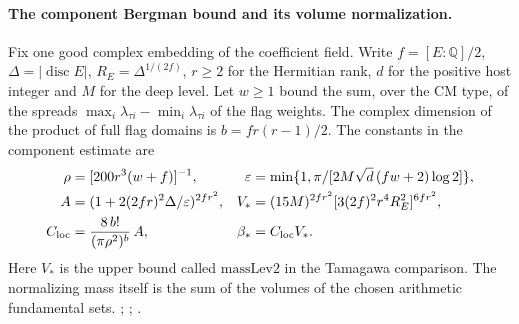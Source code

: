 \paragraph{The component Bergman bound and its volume normalization.}
Fix one good complex embedding of the coefficient field. Write
\(f=[E:\mathbb Q]/2\), \(\Delta=|\operatorname{disc}E|\),
\(R_E=\Delta^{1/(2f)}\), \(r\ge2\) for the Hermitian rank,
\(d\) for the positive host integer and \(M\) for the deep level.
Let \(w\ge1\) bound the sum, over the CM type, of the spreads
\(\max_i\lambda_{\tau i}-\min_i\lambda_{\tau i}\) of the flag weights.
The complex dimension of the product of full flag domains is
\(b=fr(r-1)/2\). The constants in the component estimate are
\begin{align*}
 \rho&=[200r^3(w+f)]^{-1},&
 \varepsilon&=\min\{1,\pi/[2M\sqrt d\,(fw+2)\log2]\},\\
 A&=(1+2(2fr)^2\Delta/\varepsilon)^{2fr^2},&
 V_*&=(15M)^{2fr^2}[3(2f)^2r^4R_E^2]^{6fr^2},\\
 C_{\rm loc}&=\frac{8\,b!}{(\pi\rho^2)^b}\,A,&
 \beta_*&=C_{\rm loc}V_* .
\end{align*}
Here \(V_*\) is the upper bound called \(\mathrm{massLev2}\) in
the Tamagawa comparison. The normalizing mass itself is the sum
of the volumes of the chosen arithmetic fundamental sets.
;
;
.

